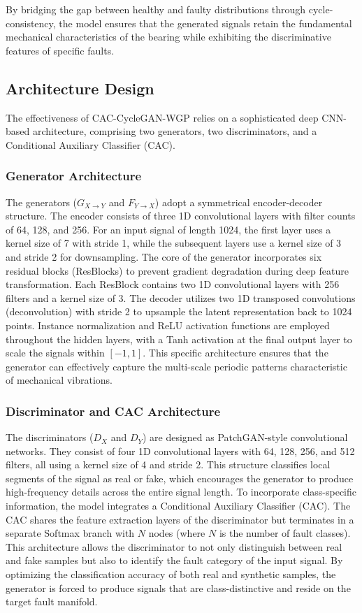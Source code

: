 By bridging the gap between healthy and faulty distributions through cycle-consistency, the model ensures that the generated signals retain the fundamental mechanical characteristics of the bearing while exhibiting the discriminative features of specific faults.

\subsection{Architecture Design}
The effectiveness of CAC-CycleGAN-WGP relies on a sophisticated deep CNN-based architecture, comprising two generators, two discriminators, and a Conditional Auxiliary Classifier (CAC).

\subsubsection{Generator Architecture}
The generators ($G_{X \to Y}$ and $F_{Y \to X}$) adopt a symmetrical encoder-decoder structure. The encoder consists of three 1D convolutional layers with filter counts of 64, 128, and 256. For an input signal of length 1024, the first layer uses a kernel size of 7 with stride 1, while the subsequent layers use a kernel size of 3 and stride 2 for downsampling. The core of the generator incorporates six residual blocks (ResBlocks) to prevent gradient degradation during deep feature transformation. Each ResBlock contains two 1D convolutional layers with 256 filters and a kernel size of 3. The decoder utilizes two 1D transposed convolutions (deconvolution) with stride 2 to upsample the latent representation back to 1024 points. Instance normalization and ReLU activation functions are employed throughout the hidden layers, with a Tanh activation at the final output layer to scale the signals within $[-1, 1]$. This specific architecture ensures that the generator can effectively capture the multi-scale periodic patterns characteristic of mechanical vibrations.

\subsubsection{Discriminator and CAC Architecture}
The discriminators ($D_X$ and $D_Y$) are designed as PatchGAN-style convolutional networks. They consist of four 1D convolutional layers with 64, 128, 256, and 512 filters, all using a kernel size of 4 and stride 2. This structure classifies local segments of the signal as real or fake, which encourages the generator to produce high-frequency details across the entire signal length. To incorporate class-specific information, the model integrates a Conditional Auxiliary Classifier (CAC). The CAC shares the feature extraction layers of the discriminator but terminates in a separate Softmax branch with $N$ nodes (where $N$ is the number of fault classes). This architecture allows the discriminator to not only distinguish between real and fake samples but also to identify the fault category of the input signal. By optimizing the classification accuracy of both real and synthetic samples, the generator is forced to produce signals that are class-distinctive and reside on the target fault manifold.

